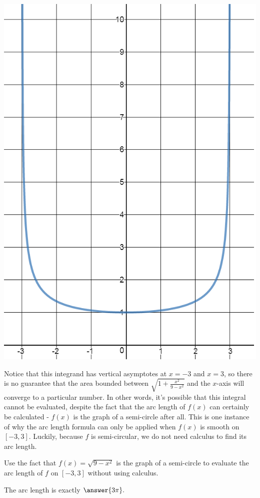 \documentclass[handout,nooutcomes]{ximera}
\begin{document}
\begin{center} \includegraphics{asymptotes.png} \end{center}

Notice that this integrand has vertical asymptotes at $x=-3$ and $x=3$, so there is no guarantee that the area bounded between $\sqrt{1+\frac{x^2}{9-x^2}}$ and the $x$-axis will converge to a particular number.  In other words, it's possible that this integral cannot be evaluated, despite the fact that the arc length of $f(x)$ can certainly be calculated - $f(x)$ is the graph of a semi-circle after all.  This is one instance of why the arc length formula can only be applied when $f(x)$ is smooth on $[-3,3]$.  Luckily, because $f$ is semi-circular, we do not need calculus to find its arc length.

\begin{problem}
Use the fact that $f(x) = \sqrt{9-x^2}$ is the graph of a semi-circle to evaluate the arc length of $f$ on $[-3,3]$ without using calculus.  

The arc length is exactly $\answer{3\pi}.$
\end{problem}
\end{document}
